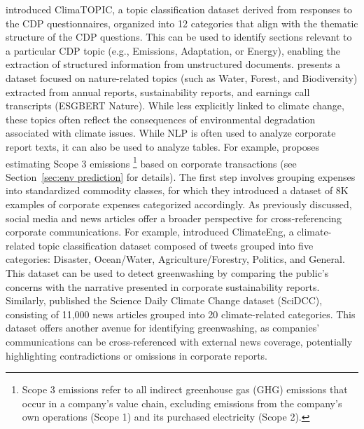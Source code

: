 \datasets \citet{spokoyny2023answering} introduced ClimaTOPIC, a topic classification dataset derived from responses to the CDP questionnaires, organized into 12 categories that align with the thematic structure of the CDP questions. This can be used to identify sections relevant to a particular CDP topic (e.g., Emissions, Adaptation, or Energy), enabling the extraction of structured information from unstructured documents. 
\citet{Schimanski2024nature} presents a dataset focused on nature-related topics (such as Water, Forest, and Biodiversity) extracted from annual reports, sustainability reports, and earnings call transcripts (ESGBERT Nature). While less explicitly linked to climate change, these topics often reflect the consequences of environmental degradation associated with climate issues. 
While NLP is often used to analyze corporate report texts, it can also be used to analyze tables. For example, \citet{jain_supply_2023} proposes estimating Scope 3 emissions \footnote{Scope 3 emissions refer to all indirect greenhouse gas (GHG) emissions that occur in a company’s value chain, excluding emissions from the company’s own operations (Scope 1) and its purchased electricity (Scope 2).} based on corporate transactions (see Section~\ref{sec:env prediction} for details). The first step involves grouping expenses into standardized commodity classes, for which they introduced a dataset of 8K examples of corporate expenses categorized accordingly. 
As previously discussed, social media and news articles offer a broader perspective for cross-referencing corporate communications. For example, \citet{vaid-etal-2022-towards} introduced ClimateEng, a climate-related topic classification dataset composed of tweets grouped into five categories: Disaster, Ocean/Water, Agriculture/Forestry, Politics, and General. 
This dataset can be used to detect greenwashing by comparing the public’s concerns with the narrative presented in corporate sustainability reports. Similarly, \citet{mishra2021neuralnere} published the Science Daily Climate Change dataset (SciDCC), consisting of 11,000 news articles grouped into 20 climate-related categories. This dataset offers another avenue for identifying greenwashing, as companies’ communications can be cross-referenced with external news coverage, potentially highlighting contradictions or omissions in corporate reports.

